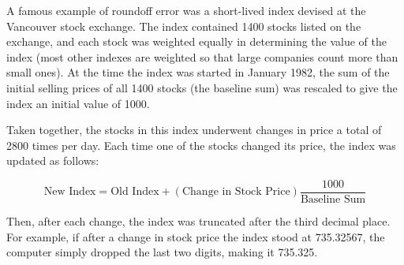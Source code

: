 \documentclass[12pt,letterpaper,answers]{exam}
\begin{document}
\begin{questions}
A famous example of roundoff error was a short-lived index devised at the Vancouver stock exchange\cite{quinn1983}. The index contained 1400 stocks listed on the exchange, and each stock was weighted equally in determining the value of the index (most other indexes are weighted so that large companies count more than small ones). At the time the index was started in January 1982, the sum of the initial selling prices of all 1400 stocks (the baseline sum) was rescaled to give the index an initial value of 1000.

Taken together, the stocks in this index underwent changes in price a total of 2800 times per day. Each time one of the stocks changed its price, the index was updated as follows:

\[\text{New Index} = \text{Old Index} + (\text{Change in Stock Price})\dfrac{1000}{\text{Baseline Sum}}\]

Then, after each change, the index was truncated after the third decimal place. For example, if after a change in stock price the index stood at 735.32567, the computer simply dropped the last two digits, making it 735.325.
\end{questions}
\end{document}

